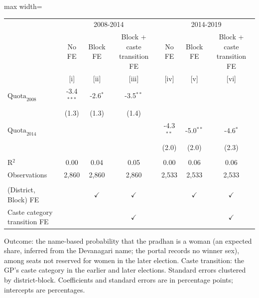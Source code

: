 
\begingroup
\centering
\scriptsize
\begin{adjustbox}{max width=\linewidth}
   \begin{threeparttable}[b]
      \begin{tabular}{lcccccc}
         \toprule
          & \multicolumn{3}{c}{2008-2014} & \multicolumn{3}{c}{2014-2019} \\
                                      & No FE        & Block FE      & Block + caste transition FE & No FE       & Block FE      & Block + caste transition FE \\
                                      & [i]          & [ii]          & [iii]                       & [iv]        & [v]           & [vi]\\
         \midrule
         $\text{Quota}_{2008}$        & -3.4$^{***}$ & -2.6$^{*}$    & -3.5$^{**}$                 &             &               &   \\
                                      & (1.3)        & (1.3)         & (1.4)                       &             &               &   \\
         $\text{Quota}_{2014}$        &              &               &                             & -4.3$^{**}$ & -5.0$^{**}$   & -4.6$^{*}$\\
                                      &              &               &                             & (2.0)       & (2.0)         & (2.3)\\
          \\
         R$^2$                        & 0.00         & 0.04          & 0.05                        & 0.00        & 0.06          & 0.06\\
         Observations                 & 2,860        & 2,860         & 2,860                       & 2,533       & 2,533         & 2,533\\
          \\
         (District, Block) FE         &              & $\checkmark$  & $\checkmark$                &             & $\checkmark$  & $\checkmark$\\
         Caste category transition FE &              &               & $\checkmark$                &             &               & $\checkmark$\\
         \bottomrule
      \end{tabular}

      \begin{tablenotes}
         \item Outcome: the name-based probability that the pradhan is a woman (an expected share, inferred from the Devanagari name; the portal records no winner sex), among seats not reserved for women in the later election. Caste transition: the GP's caste category in the earlier and later elections. Standard errors clustered by district-block. Coefficients and standard errors are in percentage points; intercepts are percentages.
      \end{tablenotes}
   \end{threeparttable}
\end{adjustbox}
\par\endgroup


